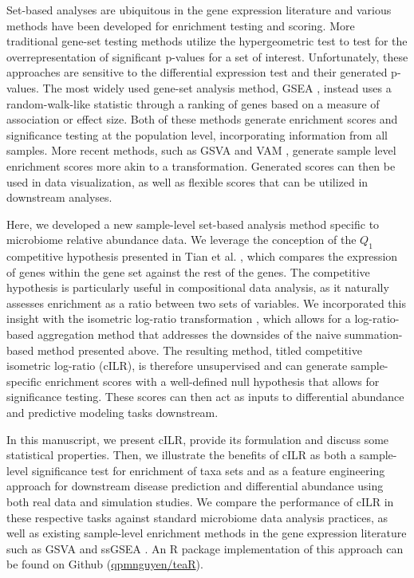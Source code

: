 \documentclass[10pt,letterpaper]{article}
\begin{document}
Set-based analyses are ubiquitous in the gene expression literature \cite{goeman2007} and various methods have been developed for enrichment testing and scoring. More traditional gene-set testing methods utilize the hypergeometric test to test for the overrepresentation of significant p-values for a set of interest. Unfortunately, these approaches are sensitive to the differential expression test and their generated p-values. The most widely used gene-set analysis method, GSEA \cite{subramanian2005}, instead uses a random-walk-like statistic through a ranking of genes based on a measure of association or effect size. Both of these methods generate enrichment scores and significance testing at the population level, incorporating information from all samples. More recent methods, such as GSVA \cite{hanzelmann2013} and VAM \cite{frost2020a}, generate sample level enrichment scores more akin to a transformation. Generated scores can then be used in data visualization, as well as flexible scores that can be utilized in downstream analyses.  

Here, we developed a new sample-level set-based analysis method specific to microbiome relative abundance data. We leverage the conception of the $Q_1$ competitive hypothesis presented in Tian et al. \cite{tian2005}, which compares the expression of genes within the gene set against the rest of the genes. The competitive hypothesis is particularly useful in compositional data analysis, as it naturally assesses enrichment as a ratio between two sets of variables. We incorporated this insight with the isometric log-ratio transformation \cite{egozcue2003}, which allows for a log-ratio-based aggregation method that addresses the downsides of the naive summation-based method presented above. The resulting method, titled competitive isometric log-ratio (cILR), is therefore unsupervised and can generate sample-specific enrichment scores with a well-defined null hypothesis that allows for significance testing. These scores can then act as inputs to differential abundance and predictive modeling tasks downstream. 

In this manuscript, we present cILR, provide its formulation and discuss some statistical properties. Then, we illustrate the benefits of cILR as both a sample-level significance test for enrichment of taxa sets and as a feature engineering approach for downstream disease prediction and differential abundance using both real data and simulation studies. We compare the performance of cILR in these respective tasks against standard microbiome data analysis practices, as well as existing sample-level enrichment methods in the gene expression literature such as GSVA \cite{hanzelmann2013} and ssGSEA \cite{barbie2009}. An R package implementation of this approach can be found on Github (\href{www.github.com/qpmnguyen/teaR}{qpmnguyen/teaR}).
\end{document}
